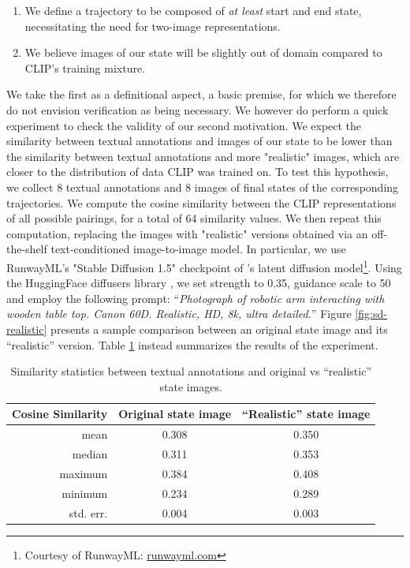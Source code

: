 \documentclass[../main.tex]{subfiles}
\begin{document}
\begin{enumerate}
	\item We define a trajectory to be composed of \emph{at least} start and end state, necessitating
	      the need for two-image representations.
	\item We believe images of our state will be slightly out of domain compared to CLIP's training
	      mixture.
\end{enumerate}

We take the first as a definitional aspect, a basic premise, for which we therefore do not envision
verification as being necessary. We however do perform a quick experiment to check the validity of
our second motivation. We expect the similarity between textual annotations and images of our state
to be lower than the similarity between textual annotations and more "realistic" images, which are
closer to the distribution of data CLIP was trained on. To test this hypothesis, we collect
8 textual annotations and 8 images of final states of the corresponding trajectories. We compute the
cosine similarity between the CLIP representations of all possible pairings, for a total of 64
similarity values. We then repeat this computation, replacing the images with "realistic" versions
obtained via an off-the-shelf text-conditioned image-to-image model. In particular, we use
RunwayML's "Stable Diffusion 1.5" checkpoint of \citet{rombach_high-resolution_2022}'s latent
diffusion model\footnote{Courtesy of RunwayML: \href{https://runwayml.com/}{runwayml.com}}. Using
the HuggingFace diffusers library \citep{von_platen_diffusers_2023}, we set strength to
0.35, guidance scale to 50 and employ the following prompt: ``\textit{Photograph of robotic arm
	interacting with wooden table top. Canon 60D. Realistic, HD, 8k, ultra detailed.}'' Figure
\ref{fig:sd-realistic} presents a sample comparison between an original state image and its
``realistic'' version. Table \ref{tab:clip-ood-check} instead summarizes the results of the
experiment.

\begin{table}[tb]
	\centering
	\caption[Original and ``Realistic'' CALVIN Similarity]{Similarity statistics between textual
		annotations and original vs ``realistic'' state images.}
	\label{tab:clip-ood-check}
	\begin{tabular}{@{}rcc@{}}
		\toprule
		Cosine Similarity & Original state image & ``Realistic'' state image \\ \midrule
		mean              & 0.308                & 0.350                     \\
		median            & 0.311                & 0.353                     \\
		maximum           & 0.384                & 0.408                     \\
		minimum           & 0.234                & 0.289                     \\
		std. err.         & 0.004                & 0.003                     \\ \bottomrule
	\end{tabular}
\end{table}
\end{document}
